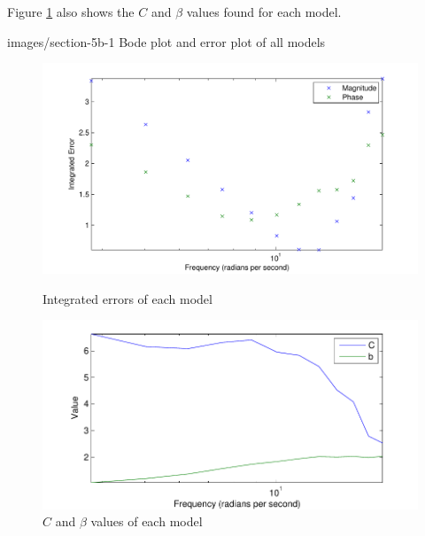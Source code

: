 Figure \ref{5b-3} also shows the $C$ and $\beta$ values found for each model.

              {images/section-5b-1}
              {Bode plot and error plot of all models\label{5b-1}}

\begin{figure}
  \centering
  \begin{minipage}{0.4\linewidth}
    \centering
    \includegraphics[width=\textwidth]{images/section-5b-2}
    \caption{\small Integrated errors of each model\label{5b-2}}
  \end{minipage}
  \hspace{0.1\linewidth}
  \begin{minipage}{0.4\linewidth}
    \centering
    \includegraphics[width=\textwidth]{images/section-5b-3}
    \caption{\small$C$ and $\beta$ values of each model\label{5b-3}}
  \end{minipage}
\end{figure}
